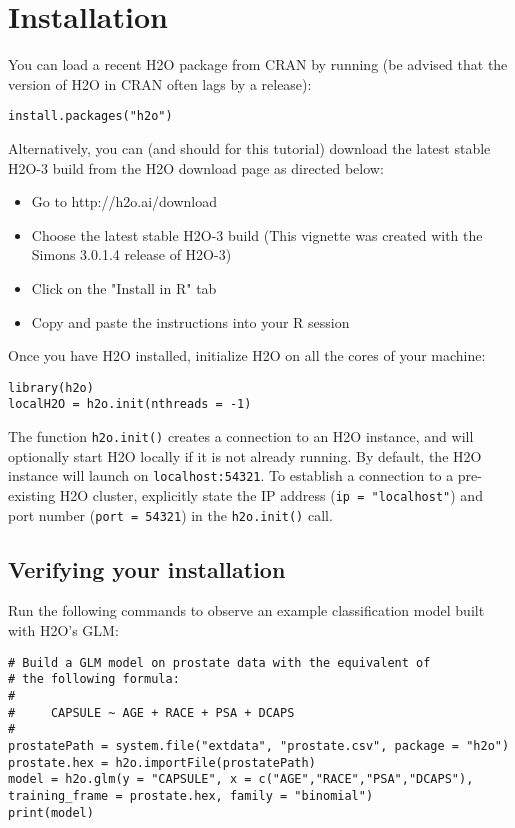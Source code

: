 
\section{Installation} 

You can load a recent H2O package from CRAN by running (be advised that the version of H2O in CRAN often lags by a release):

\begin{lstlisting}[style=R]
install.packages("h2o")
\end{lstlisting}

Alternatively, you can (and should for this tutorial) download the latest stable H2O-3 build from the H2O download page as directed below:

\begin{itemize}
\item Go to http://h2o.ai/download
\item Choose the latest stable H2O-3 build (This vignette was created with the Simons 3.0.1.4 release of H2O-3)
\item Click on the "Install in R" tab
\item Copy and paste the instructions into your R session
\end{itemize}

\bigskip
Once you have H2O installed, initialize H2O on all the cores of your machine:

\begin{lstlisting}[style=R]
library(h2o)
localH2O = h2o.init(nthreads = -1)
\end{lstlisting}

The function \texttt{h2o.init()} creates a connection to an H2O instance, and will optionally start H2O locally if it is not already running. By default, the H2O instance will launch on \texttt{localhost:54321}. To establish a connection to a pre-existing H2O cluster, explicitly state the IP address (\texttt{ip = "localhost"}) and port number (\texttt{port = 54321}) in the \texttt{h2o.init()} call.


\subsection{Verifying your installation}
Run the following commands to observe an example classification model built with H2O's GLM:

\begin{lstlisting}[style=R]
# Build a GLM model on prostate data with the equivalent of
# the following formula:
#
#     CAPSULE ~ AGE + RACE + PSA + DCAPS
#
prostatePath = system.file("extdata", "prostate.csv", package = "h2o")
prostate.hex = h2o.importFile(prostatePath)
model = h2o.glm(y = "CAPSULE", x = c("AGE","RACE","PSA","DCAPS"), training_frame = prostate.hex, family = "binomial")
print(model)
\end{lstlisting}

